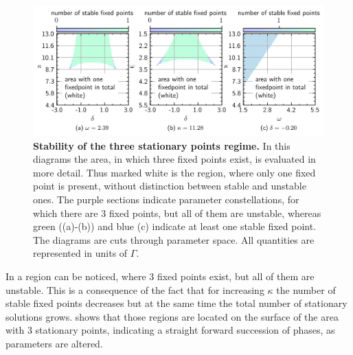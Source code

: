 \begin{figure}[H]
    \vspace*{-0.3cm}
    \includegraphics{pictures/numb_of_fixp_stabcuts2.png}
    \caption{\textbf{Stability of the three stationary points regime.} In this diagrams the area, in which three fixed points exist, is evaluated in more detail. Thus marked white is the region, where only one fixed point is present, without distinction between stable and unstable ones. The purple sections indicate parameter constellations, for which there are 3 fixed points, but all of them are unstable, whereas green ((a)-(b)) and blue (c) indicate at least one stable fixed point. The diagrams are cuts through parameter space. All quantities are represented in units of $\Gamma$.}
    \label{fig:stability_cuts}
\end{figure}
In  a region can be noticed, where 3 fixed points exist, but all of them are unstable. This is a consequence of the fact that for increasing $\kappa$ the number of stable fixed points decreases but at the same time the total number of stationary solutions grows.  shows that those regions are located on the surface of the area with 3 stationary points, indicating a straight forward succession of phases, as parameters are altered.

